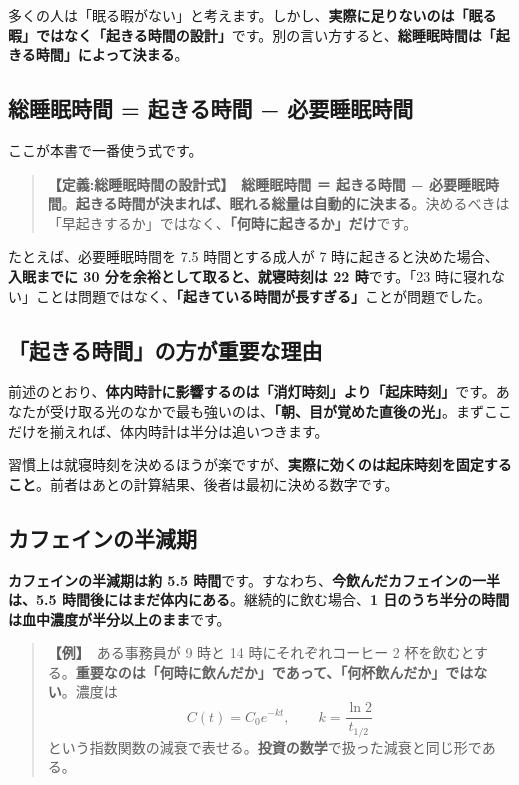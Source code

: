 \documentclass{article}
\begin{document}
多くの人は「眠る暇がない」と考えます。しかし、\textbf{実際に足りないのは「眠る暇」ではなく「起きる時間の設計」}です。別の言い方すると、\textbf{総睡眠時間は「起きる時間」によって決まる}。

\subsection{総睡眠時間 = 起きる時間 − 必要睡眠時間}

ここが本書で一番使う式です。

\begin{quote}
\textbf{【定義:総睡眠時間の設計式】}\ \textbf{総睡眠時間 ＝ 起きる時間 − 必要睡眠時間}。\textbf{起きる時間が決まれば、眠れる総量は自動的に決まる}。決めるべきは「早起きするか」ではなく、\textbf{「何時に起きるか」だけ}です。
\end{quote}

たとえば、必要睡眠時間を 7.5 時間とする成人が 7 時に起きると決めた場合、\textbf{入眠までに 30 分を余裕として取ると、就寝時刻は 22 時}です。「23 時に寝れない」ことは問題ではなく、\textbf{「起きている時間が長すぎる」}ことが問題でした。

\subsection{「起きる時間」の方が重要な理由}

前述のとおり、\textbf{体内時計に影響するのは「消灯時刻」より「起床時刻」}です。あなたが受け取る光のなかで最も強いのは、\textbf{「朝、目が覚めた直後の光」}。まずここだけを揃えれば、体内時計は半分は追いつきます。

習慣上は就寝時刻を決めるほうが楽ですが、\textbf{実際に効くのは起床時刻を固定すること}。前者はあとの計算結果、後者は最初に決める数字です。

\subsection{カフェインの半減期}

\textbf{カフェインの半減期は約 5.5 時間}です。すなわち、\textbf{今飲んだカフェインの一半は、5.5 時間後にはまだ体内にある}。継続的に飲む場合、\textbf{1 日のうち半分の時間は血中濃度が半分以上のまま}です。

\begin{quote}
\textbf{【例】}\ ある事務員が 9 時と 14 時にそれぞれコーヒー 2 杯を飲むとする。\textbf{重要なのは「何時に飲んだか」であって、「何杯飲んだか」ではない}。濃度は
\[ C(t) = C_0 e^{-kt}, \qquad k = \frac{\ln 2}{t_{1/2}} \]
という指数関数の減衰で表せる。\textbf{投資の数学}で扱った減衰と同じ形である。
\end{quote}
\end{document}

